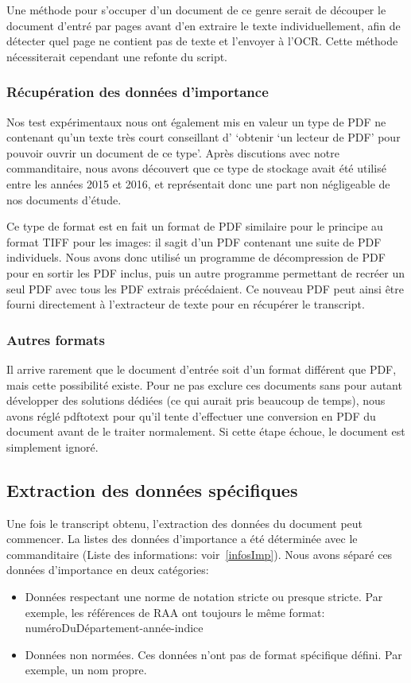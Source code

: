Une méthode pour s'occuper d'un document de ce genre serait de découper le document d'entré par pages avant d'en extraire le texte individuellement, afin de détecter quel page ne contient pas de texte et l'envoyer à l'OCR\@.
Cette méthode nécessiterait cependant une refonte du script.

\subsubsection{Récupération des données d'importance}
Nos test expérimentaux nous ont également mis en valeur un type de PDF ne contenant qu'un texte très court conseillant d' `obtenir `un lecteur de PDF' pour pouvoir ouvrir un document de ce type'.
Après discutions avec notre commanditaire, nous avons découvert que ce type de stockage avait été utilisé entre les années 2015 et 2016, et représentait donc une part non négligeable de nos documents d'étude.

Ce type de format est en fait un format de PDF similaire pour le principe au format TIFF pour les images: il sagit d'un PDF contenant une suite de PDF individuels.
Nous avons donc utilisé un programme de décompression de PDF pour en sortir les PDF inclus, puis un autre programme permettant de recréer un seul PDF avec tous les PDF extrais précédaient.
Ce nouveau PDF peut ainsi être fourni directement à l'extracteur de texte pour en récupérer le transcript.

\subsubsection{Autres formats}
Il arrive rarement que le document d'entrée soit d'un format différent que PDF, mais cette possibilité existe.
Pour ne pas exclure ces documents sans pour autant développer des solutions dédiées (ce qui aurait pris beaucoup de temps), nous avons réglé pdftotext pour qu'il tente d'effectuer une conversion en PDF du document avant de le traiter normalement.
Si cette étape échoue, le document est simplement ignoré.



\subsection{Extraction des données spécifiques}
Une fois le transcript obtenu, l'extraction des données du document peut commencer.
La listes des données d'importance a été déterminée avec le commanditaire (Liste des informations: voir~\ref{infosImp}).
Nous avons séparé ces données d'importance en deux catégories:
\begin{itemize}
\item Données respectant une norme de notation stricte ou presque stricte.\newline
Par exemple, les références de RAA ont toujours le même format: numéroDuDépartement-année-indice
\item Données non normées.\newline
Ces données n'ont pas de format spécifique défini.
Par exemple, un nom propre.
\end{itemize}

